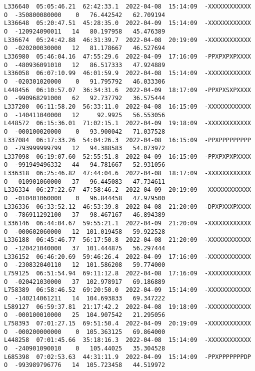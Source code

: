 \documentclass[12pt]{article}
\begin{document}
\begin{verbatim}
L336640  05:05:46.21  62:42:33.1  2022-04-08  15:14:09  -XXXXXXXXXXXX  O  -350800080000    0   76.442542   62.709194
L336648  05:20:47.51  45:28:35.0  2022-04-09  15:14:09  -XXXXXXXXXXXX  O  -120924090011   14   80.197958   45.476389
L336674  05:24:42.88  46:31:39.7  2022-04-08  20:19:09  -XXXXXXXXXXXX  O  -020200030000   12   81.178667   46.527694
L336980  05:46:04.16  47:55:29.6  2022-04-09  17:16:09  -PPXPXPXPXXXX  O  -480936091010   12   86.517333   47.924889
L336058  06:07:10.99  46:01:59.9  2022-04-08  15:14:09  -XXXXXXXXXXXX  O  -020301020000    0   91.795792   46.033306
L448456  06:10:57.07  36:34:31.6  2022-04-09  18:17:09  -PPXPXSXPXXXX  O  -990968291000   62   92.737792   36.575444
L337200  06:11:58.20  56:33:11.0  2022-04-08  16:15:09  -XXXXXXXXXXXX  O  -140411040000   12     92.9925   56.553056
L448572  06:15:36.01  71:02:15.1  2022-04-09  19:18:09  -XXXXXXXXXXXX  O  -000100020000    0   93.900042   71.037528
L337084  06:17:33.26  54:04:26.3  2022-04-08  16:15:09  -PPXPPPPPPPPP  O  -793999999799   12   94.388583   54.073972
L337098  06:19:07.60  52:55:51.8  2022-04-09  16:15:09  -PPXPXPXPXXXX  O  -991949496332   44   94.781667   52.931056
L336318  06:25:46.82  47:44:04.6  2022-04-08  18:17:09  -XXXXXXXXXXXX  O  -010901060000   37   96.445083   47.734611
L336334  06:27:22.67  47:58:46.2  2022-04-09  20:19:09  -XXXXXXXXXXXX  O  -010401060000    0   96.844458   47.979500
L336336  06:33:52.12  46:53:39.8  2022-04-08  21:20:09  -DPXPXXXPXXXX  O  -786911292100   37   98.467167   46.894389
L336146  06:44:04.67  59:55:21.1  2022-04-09  21:20:09  -XXXXXXXXXXXX  O  -000602060000   12  101.019458   59.922528
L336188  06:45:46.77  56:17:50.8  2022-04-08  21:20:09  -XXXXXXXXXXXX  O  -120421040000   37  101.444875   56.297444
L336152  06:46:20.69  59:46:26.4  2022-04-09  17:16:09  -XXXXXXXXXXXX  O  -230832040110   12  101.586208   59.774000
L759125  06:51:54.94  69:11:12.8  2022-04-08  17:16:09  -XXXXXXXXXXXX  O  -020421030000   37  102.978917   69.186889
L758389  06:58:46.52  69:20:50.0  2022-04-09  15:14:09  -XXXXXXXXXXXX  O  -140214061211   14  104.693833   69.347222
L589127  06:59:37.81  21:17:42.2  2022-04-08  19:18:09  -XXXXXXXXXXXX  O  -000100010000   25  104.907542   21.295056
L758393  07:01:27.15  69:51:50.4  2022-04-09  20:19:09  -XXXXXXXXXXXX  O  -000200000000    0  105.363125   69.864000
L448258  07:01:45.66  35:18:16.3  2022-04-08  15:14:09  -XXXXXXXXXXXX  O  -240901090010    0   105.44025   35.304528
L685398  07:02:53.63  44:31:11.9  2022-04-09  15:14:09  -PPXPPPPPPPDP  O  -993989796776   14  105.723458   44.519972

\end{verbatim}
\end{document}
